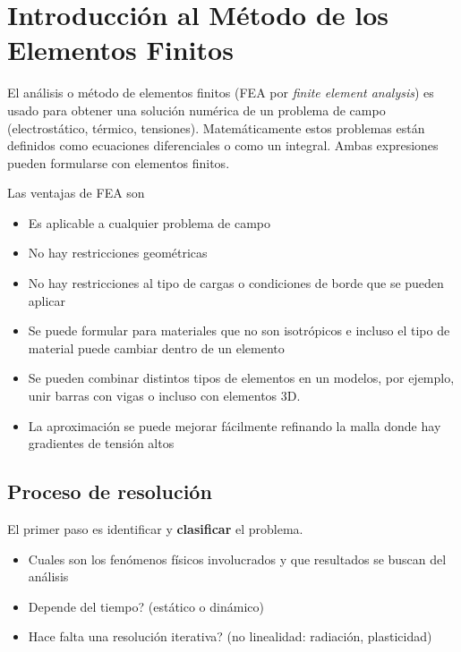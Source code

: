 \section{Introducción al Método de los Elementos Finitos}
El análisis o método de elementos finitos (FEA por \textit{finite element analysis}) es usado para obtener una solución numérica de un problema de campo (electrostático, térmico, tensiones). Matemáticamente estos problemas están definidos como ecuaciones diferenciales o como un integral. Ambas expresiones pueden formularse con elementos finitos.

Las ventajas de FEA son
\vspace{-.3cm}
\begin{itemize}
	\item Es aplicable a cualquier problema de campo
	\item No hay restricciones geométricas
	\item No hay restricciones al tipo de cargas o condiciones de borde que se pueden aplicar
	\item Se puede formular para materiales que no son isotrópicos e incluso el tipo de material puede cambiar dentro de un elemento
	\item Se pueden combinar distintos tipos de elementos en un modelos, por ejemplo, unir barras con vigas o incluso con elementos 3D.
	\item La aproximación se puede mejorar fácilmente refinando la malla donde hay gradientes de tensión altos
\end{itemize}
\vspace{-.7cm}
\subsection*{Proceso de resolución}
El primer paso es identificar y \textbf{clasificar} el problema.
\begin{itemize}
	\item Cuales son los fenómenos físicos involucrados y que resultados se buscan del análisis
	\item Depende del tiempo? (estático o dinámico)
	\item Hace falta una resolución iterativa? (no linealidad: radiación, plasticidad)
\end{itemize} 

